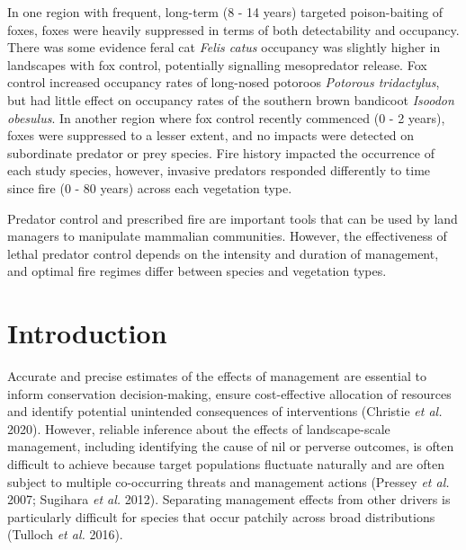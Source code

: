 \documentclass[11pt,a4paper,titlepage,twoside,openright]{style/unimelbthesis}
\begin{document}
\begin{mainmatter}
In one region with frequent, long-term (8 - 14 years) targeted poison-baiting of foxes, foxes were heavily suppressed in terms of both detectability and occupancy. There was some evidence feral cat \emph{Felis catus} occupancy was slightly higher in landscapes with fox control, potentially signalling mesopredator release. Fox control increased occupancy rates of long-nosed potoroos \emph{Potorous tridactylus}, but had little effect on occupancy rates of the southern brown bandicoot \emph{Isoodon obesulus}. In another region where fox control recently commenced (0 - 2 years), foxes were suppressed to a lesser extent, and no impacts were detected on subordinate predator or prey species. Fire history impacted the occurrence of each study species, however, invasive predators responded differently to time since fire (0 - 80 years) across each vegetation type.

Predator control and prescribed fire are important tools that can be used by land managers to manipulate mammalian communities. However, the effectiveness of lethal predator control depends on the intensity and duration of management, and optimal fire regimes differ between species and vegetation types.

\newpage

\hypertarget{introduction-1}{%
\section{Introduction}\label{introduction-1}}

Accurate and precise estimates of the effects of management are essential to inform conservation decision-making, ensure cost-effective allocation of resources and identify potential unintended consequences of interventions (Christie \emph{et al.} 2020). However, reliable inference about the effects of landscape-scale management, including identifying the cause of nil or perverse outcomes, is often difficult to achieve because target populations fluctuate naturally and are often subject to multiple co-occurring threats and management actions (Pressey \emph{et al.} 2007; Sugihara \emph{et al.} 2012). Separating management effects from other drivers is particularly difficult for species that occur patchily across broad distributions (Tulloch \emph{et al.} 2016).


\end{mainmatter}
\end{document}
